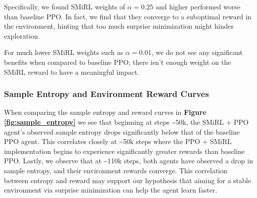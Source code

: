 Specifically, we found SMiRL weights of $ \alpha = 0.25$ and higher performed worse than baseline PPO. 
In fact, we find that they converge to a suboptimal reward in the environment, hinting that too much surprise minimization might hinder exploration. 

For much lower SMiRL weights such as $ \alpha = 0.01 $, we do not see any 
significant benefits when compared to baseline PPO; there isn't enough 
weight on the SMiRL reward to have a meaningful impact. 

\subsubsection{Sample Entropy and Environment Reward Curves}
When comparing the sample entropy and reward curves in \textbf{Figure \ref{fig:sample_entropy}} 
we see that beginning at steps \textasciitilde 50k, the SMiRL + PPO agent's observed 
sample entropy drops significantly below that of the baseline PPO agent. 
This correlates closely at \textasciitilde 50k steps where the PPO + SMiRL implementation begins to experience significantly greater rewards than baseline PPO. 
Lastly, we observe that at \textasciitilde 110k steps, both agents have observed a drop in sample entropy, and their environment rewards converge.
This correlation between entropy and reward may support our hypothesis that aiming for a stable environment via surprise minimization can help the agent learn faster.

